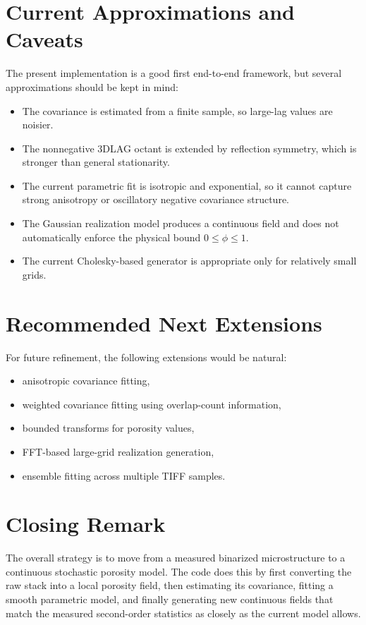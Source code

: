 \documentclass[11pt]{article}
\begin{document}
\section{Current Approximations and Caveats}
The present implementation is a good first end-to-end framework, but several
approximations should be kept in mind:
\begin{itemize}
\item The covariance is estimated from a finite sample, so large-lag values are
noisier.
\item The nonnegative 3DLAG octant is extended by reflection symmetry, which is
stronger than general stationarity.
\item The current parametric fit is isotropic and exponential, so it cannot
capture strong anisotropy or oscillatory negative covariance structure.
\item The Gaussian realization model produces a continuous field and does not
automatically enforce the physical bound \(0 \le \phi \le 1\).
\item The current Cholesky-based generator is appropriate only for relatively
small grids.
\end{itemize}

\section{Recommended Next Extensions}
For future refinement, the following extensions would be natural:
\begin{itemize}
\item anisotropic covariance fitting,
\item weighted covariance fitting using overlap-count information,
\item bounded transforms for porosity values,
\item FFT-based large-grid realization generation,
\item ensemble fitting across multiple TIFF samples.
\end{itemize}

\section{Closing Remark}
The overall strategy is to move from a measured binarized microstructure to a
continuous stochastic porosity model. The code does this by first converting the
raw stack into a local porosity field, then estimating its covariance, fitting a
smooth parametric model, and finally generating new continuous fields that match
the measured second-order statistics as closely as the current model allows.
\end{document}
